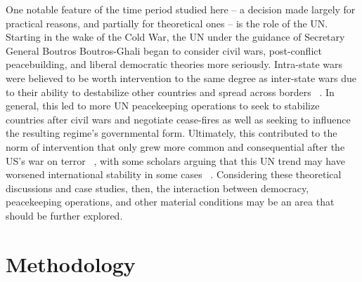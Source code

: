 \documentclass{article}
\begin{document}
One notable feature of the time period studied here -- a decision made largely for practical reasons, and partially for theoretical ones -- is the role of the UN. Starting in the wake of the Cold War, the UN under the guidance of Secretary General Boutros Boutros-Ghali began to consider civil wars, post-conflict peacebuilding, and liberal democratic theories more seriously. Intra-state wars were believed to be worth intervention to the same degree as inter-state wars due to their ability to destabilize other countries and spread across borders ~\cite{hozic}. In general, this led to more UN peacekeeping operations to seek to stabilize countries after civil wars and negotiate cease-fires as well as seeking to influence the resulting regime's governmental form. Ultimately, this contributed to the norm of intervention that only grew more common and consequential after the US's war on terror ~\cite{hozic}, with some scholars arguing that this UN trend may have worsened international stability in some cases ~\cite{bayrasli-fa}. Considering these theoretical discussions and case studies, then, the interaction between democracy, peacekeeping operations, and other material conditions may be an area that should be further explored.

\section{Methodology}
\end{document}
